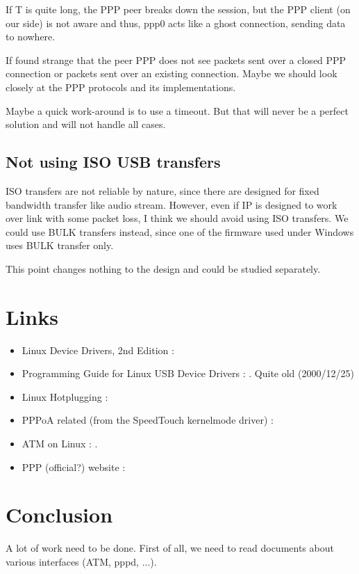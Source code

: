 \documentclass[a4paper,12pt]{article}
\begin{document}
If T is quite long, the PPP peer breaks down the session, but the PPP
client (on our side) is not aware and thus, ppp0 acts like a ghost
connection, sending data to nowhere.

If found strange that the peer PPP does not see packets sent over a
closed PPP connection or packets sent over an existing connection.
Maybe we should look closely at the PPP protocols and its
implementations.

Maybe a quick work-around is to use a timeout. But that will never be
a perfect solution and will not handle all cases.

\subsection{Not using ISO USB transfers}

ISO transfers are not reliable by nature, since there are designed for fixed
bandwidth transfer like audio stream. However, even if IP is designed
to work over link with some packet loss, I think we should avoid using
ISO transfers. We could use BULK transfers instead, since one of the
firmware used under Windows uses BULK transfer only.

This point changes nothing to the design and could be studied separately.

\section{Links}

\begin{itemize}
  
\item Linux Device Drivers, 2nd Edition :

\item Programming Guide for Linux USB Device Drivers :
  .
  Quite old (2000/12/25)
  
\item Linux Hotplugging :
  
\item PPPoA related (from the SpeedTouch kernelmode driver) :
  
\item ATM on Linux :
  .
  
\item PPP (official?) website :
  
\end{itemize}

\section{Conclusion}

A lot of work need to be done. First of all, we need to read documents
about various interfaces (ATM, pppd, ...).
\end{document}
